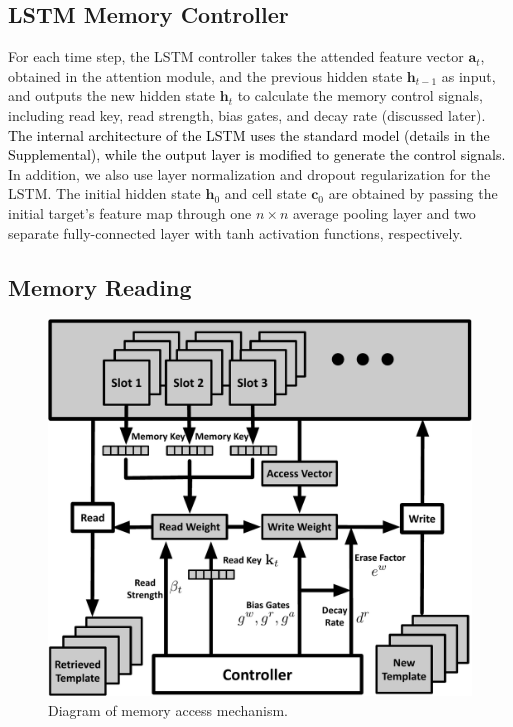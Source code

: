 \documentclass[runningheads]{llncs}
\newcommand{\abcn}[1]{\textcolor{black}{#1}}
\begin{document}
\subsection{LSTM Memory Controller}

For each time step, the LSTM controller takes the attended feature vector $\mathbf{a}_t$, obtained in the attention module, and the previous hidden state $\mathbf{h}_{t-1}$ as input, and outputs the new hidden state $\mathbf{h}_t$ to calculate the memory control signals, including read key, read strength, bias gates, and decay rate (discussed later).
\abcn{The internal architecture of the LSTM uses the standard model (details in the Supplemental), while the output layer is modified to generate the control signals.}
In addition, we also use layer normalization \cite{Ba2016} and dropout regularization \cite{Srivastava2014} for the LSTM. The initial hidden state $\mathbf{h}_0$ and cell state $\mathbf{c}_0$  %
are  
obtained by passing the initial target's feature map through one $n\times n$ average pooling layer and two separate fully-connected layer with tanh activation functions, respectively.


\subsection{Memory Reading}
\begin{figure}[t]
	\begin{center}
		\includegraphics[width=0.61\linewidth]{mem_access.pdf}
	\end{center}
	\vspace{-3mm}
	\caption{Diagram of memory access mechanism.}
	\vspace{-2mm}
	\label{fig:4}
\end{figure}
\end{document}

